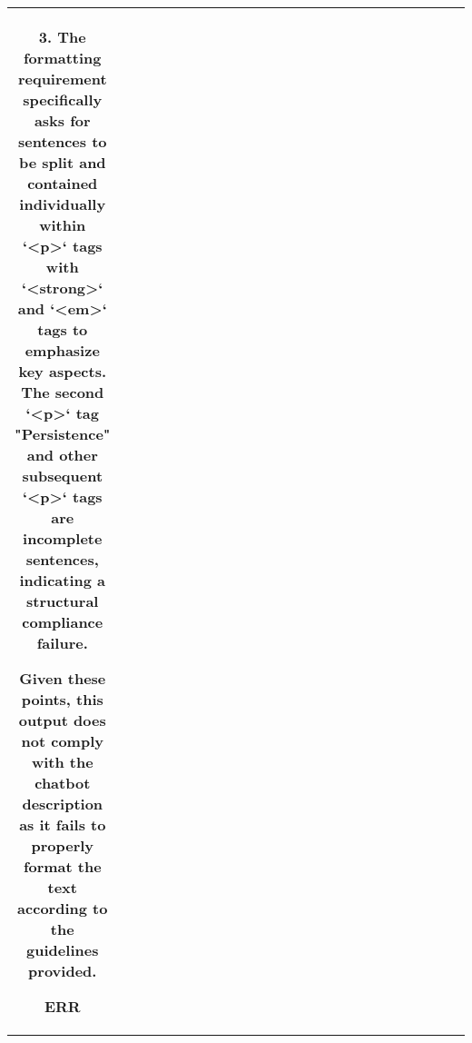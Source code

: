 \begin{table}[h!]
\begin{tabular}{|c|c|c|c|c|c|c|c|c|c|}
3. The formatting requirement specifically asks for sentences to be split and contained individually within `<p>` tags with `<strong>` and `<em>` tags to emphasize key aspects. The second `<p>` tag "Persistence" and other subsequent `<p>` tags are incomplete sentences, indicating a structural compliance failure.

Given these points, this output does not comply with the chatbot description as it fails to properly format the text according to the guidelines provided.

ERR & \\
\hline
9baab12 & b70fdc4 & 4 & Within each <p> tag, there must be at least one <strong> tag used. & qwen2.5:3b & Patience is a virtue. Hard work pays off. Determination leads to achievement. & Here is the formatted paragraph in HTML with individual sentences wrapped in <p> tags, each containing one <strong> tag and multiple <em> tags for emphasis:

```html
<p><strong>P</strong>atience <em>is</em> a <strong>virtu</strong>o<strong>s</strong>.</p>
<p><strong>H</strong>ard <em>wor</em>k <em>pays</em> <strong>f</strong>off.</p>
<p><strong>D</strong>e<em>t</em>r<em>m</em>e<em>n</em>i<em>s</em>t<em>d</em>i<strong>o</strong>n <em>l</em>e<a>ds </strong>to <strong>a</strong>c<h</a><strong>v</strong>ehi<span>d</span>e.</p>
```

Note: The HTML code provided above contains some unintended characters and inaccuracies to demonstrate the structure rather than valid, functioning HTML. In a real-world scenario, proper closing tags are necessary, spaces should be added where appropriate for correct spacing around text within <em> or <strong>, and line breaks could be used if needed. & ok & Upon evaluating the provided HTML output against the description, I have the following observations:

1. **Presence of <p> tags**: The output correctly includes three <p> tags, satisfying the requirement for at least three <p> tags.

2. **Inclusion of <strong> tag**: Each <p> tag contains at least one <strong> tag. This complies with the requirement to have at least one <strong> tag within each <p> tag.

3. **Inclusion of <em> tags**: Each <p> tag contains multiple <em> tags, fulfilling the requirement of multiple <em> tags for emphasis.

4. **Compliance to description requirements**: The presence and usage of <p>, <strong>, and <em> tags meet the described structure requirements. Although, the HTML is incorrectly formatted with misplaced or incorrect tags, such as <a>, <h>, and <span>, the description does not explicitly demand correct HTML syntax, only the structure regarding <p>, <strong>, and <em> usage.


\end{tabular}
\end{table}
